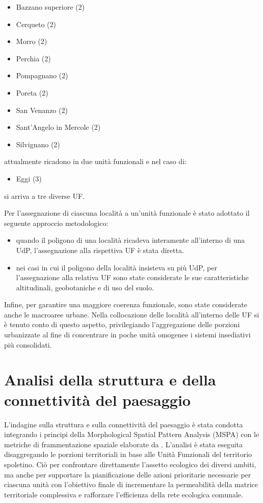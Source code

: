 \documentclass[
  a4paper,
]{book}
\providecommand{\tightlist}{%
  \setlength{\itemsep}{0pt}\setlength{\parskip}{0pt}}
\begin{document}
\begin{itemize}
\tightlist
\item
  Bazzano superiore (2)
\item
  Cerqueto (2)
\item
  Morro (2)
\item
  Perchia (2)
\item
  Pompagnano (2)
\item
  Poreta (2)
\item
  San Venanzo (2)
\item
  Sant'Angelo in Mercole (2)
\item
  Silvignano (2)
\end{itemize}

attualmente ricadono in due unità funzionali e nel caso di:

\begin{itemize}
\tightlist
\item
  Eggi (3)
\end{itemize}

si arriva a tre diverse UF.

Per l'assegnazione di ciascuna località a un'unità funzionale è stato adottato il seguente approccio metodologico:

\begin{itemize}
\tightlist
\item
  quando il poligono di una località ricadeva interamente all'interno di una UdP, l'assegnazione alla rispettiva UF è stata diretta.
\item
  nei casi in cui il poligono della località insisteva su più UdP, per l'assegnazione alla relativa UF sono state considerate le sue caratteristiche altitudinali, geobotaniche e di uso del suolo.
\end{itemize}

Infine, per garantire una maggiore coerenza funzionale, sono state considerate anche le macroaree urbane.
Nella collocazione delle località all'interno delle UF si è tenuto conto di questo aspetto, privilegiando l'aggregazione delle porzioni urbanizzate al fine di concentrare in poche unità omogenee i sistemi insediativi più consolidati.

\section{Analisi della struttura e della connettività del paesaggio}\label{analisi-della-struttura-e-della-connettivituxe0-del-paesaggio}

L'indagine sulla struttura e sulla connettività del paesaggio è stata condotta integrando i principi della Morphological Spatial Pattern Analysis (MSPA)\citep{vogt2025} con le metriche di frammentazione spaziale elaborate da \citep{jaeger2000}.
L'analisi è stata eseguita disaggregando le porzioni territoriali in base alle Unità Funzionali del territorio spoletino.
Ciò per confrontare direttamente l'assetto ecologico dei diversi ambiti, ma anche per supportare la pianificazione delle azioni prioritarie necessarie per ciascuna unità con l'obiettivo finale di incrementare la permeabilità della matrice territoriale complessiva e rafforzare l'efficienza della rete ecologica comunale.
\end{document}
